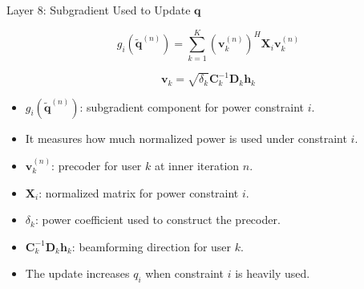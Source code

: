 \documentclass{beamer}
\begin{document}
\begin{frame}{Layer 8: Subgradient Used to Update \(\mathbf{q}\)}
\scriptsize

\[
g_i(\widetilde{\mathbf{q}}^{(n)})
=
\sum_{k=1}^{K}
\left(\mathbf{v}_k^{(n)}\right)^H
\mathbf{X}_i
\mathbf{v}_k^{(n)}
\]

\[
\mathbf{v}_k
=
\sqrt{\delta_k}
\mathbf{C}_k^{-1}
\mathbf{D}_k\mathbf{h}_k
\]

\begin{itemize}
    \item \(g_i(\widetilde{\mathbf{q}}^{(n)})\): subgradient component for power constraint \(i\).

    \item It measures how much normalized power is used under constraint \(i\).

    \item \(\mathbf{v}_k^{(n)}\): precoder for user \(k\) at inner iteration \(n\).

    \item \(\mathbf{X}_i\): normalized matrix for power constraint \(i\).

    \item \(\delta_k\): power coefficient used to construct the precoder.

    \item \(\mathbf{C}_k^{-1}\mathbf{D}_k\mathbf{h}_k\): beamforming direction for user \(k\).

    \item The update increases \(q_i\) when constraint \(i\) is heavily used.
\end{itemize}

\end{frame}
\end{document}
